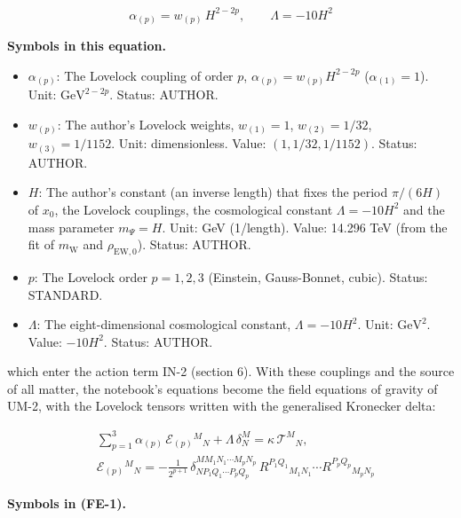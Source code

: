 \documentclass[
  10pt,
]{article}
\providecommand{\tightlist}{%
  \setlength{\itemsep}{0pt}\setlength{\parskip}{0pt}}
\begin{document}
\[
\alpha_{(p)} = w_{(p)}\,H^{2-2p},\qquad \Lambda = -10H^2
\]

\textbf{Symbols in this equation.}

\begin{itemize}
\tightlist
\item
  \(\alpha_{(p)}\): The Lovelock coupling of order \(p\),
  \(\alpha_{(p)} = w_{(p)}H^{2-2p}\) (\(\alpha_{(1)} = 1\)). Unit:
  \(\mathrm{GeV}^{2-2p}\). Status: AUTHOR.
\item
  \(w_{(p)}\): The author's Lovelock weights, \(w_{(1)} = 1\),
  \(w_{(2)} = 1/32\), \(w_{(3)} = 1/1152\). Unit: dimensionless. Value:
  \((1, 1/32, 1/1152)\). Status: AUTHOR.
\item
  \(H\): The author's constant (an inverse length) that fixes the period
  \(\pi/(6H)\) of \(x_0\), the Lovelock couplings, the cosmological
  constant \(\Lambda = -10H^2\) and the mass parameter \(m_\Psi = H\).
  Unit: GeV (1/length). Value: 14.296 TeV (from the fit of
  \(m_{\mathrm{W}}\) and \(\rho_{\mathrm{EW},0}\)). Status: AUTHOR.
\item
  \(p\): The Lovelock order \(p = 1, 2, 3\) (Einstein, Gauss-Bonnet,
  cubic). Status: STANDARD.
\item
  \(\Lambda\): The eight-dimensional cosmological constant,
  \(\Lambda = -10H^2\). Unit: \(\mathrm{GeV}^{2}\). Value: \(-10H^2\).
  Status: AUTHOR.
\end{itemize}

which enter the action term IN-2 (section 6). With these couplings and
the source of all matter, the notebook's equations become the field
equations of gravity of UM-2, with the Lovelock tensors written with the
generalised Kronecker delta:

\[
\begin{aligned}
&\sum_{p=1}^{3}\alpha_{(p)}\,\mathcal{E}_{(p)}{}^M{}_N + \Lambda\,\delta^M_N = \kappa\,\mathcal{T}^M{}_N,\\
&\mathcal{E}_{(p)}{}^M{}_N = -\frac{1}{2^{p+1}}\,\delta^{MM_1N_1\cdots M_pN_p}_{NP_1Q_1\cdots P_pQ_p}\,
 R^{P_1Q_1}{}_{M_1N_1}\cdots R^{P_pQ_p}{}_{M_pN_p}
\end{aligned} \tag{FE-1}
\]

\textbf{Symbols in (FE-1).}
\end{document}
